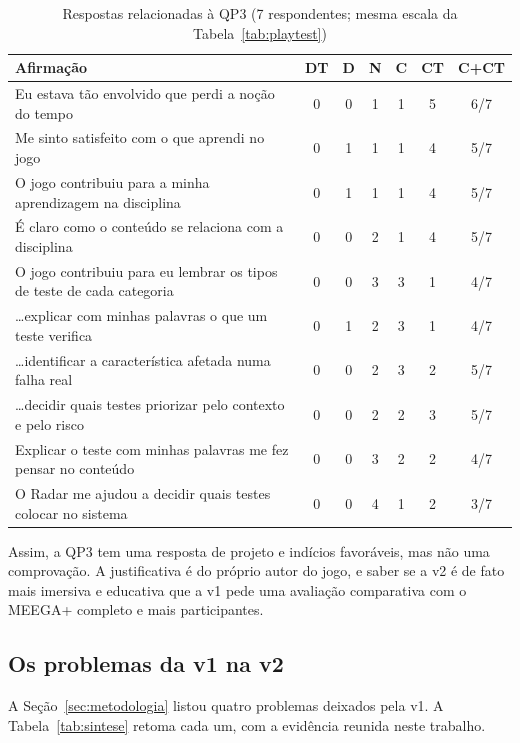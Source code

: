 \begin{table}[ht]
  \centering
  \caption{Respostas relacionadas à QP3 (7 respondentes; mesma escala da Tabela~\ref{tab:playtest})}
  \label{tab:qp3}
  \scriptsize
  \begin{tabularx}{\linewidth}{>{\raggedright\arraybackslash}X c c c c c c}
    \toprule
    Afirmação & DT & D & N & C & CT & C+CT \\
    \midrule
    Eu estava tão envolvido que perdi a noção do tempo & 0 & 0 & 1 & 1 & 5 & 6/7 \\
    Me sinto satisfeito com o que aprendi no jogo & 0 & 1 & 1 & 1 & 4 & 5/7 \\
    O jogo contribuiu para a minha aprendizagem na disciplina & 0 & 1 & 1 & 1 & 4 & 5/7 \\
    É claro como o conteúdo se relaciona com a disciplina & 0 & 0 & 2 & 1 & 4 & 5/7 \\
    O jogo contribuiu para eu lembrar os tipos de teste de cada categoria & 0 & 0 & 3 & 3 & 1 & 4/7 \\
    \ldots explicar com minhas palavras o que um teste verifica & 0 & 1 & 2 & 3 & 1 & 4/7 \\
    \ldots identificar a característica afetada numa falha real & 0 & 0 & 2 & 3 & 2 & 5/7 \\
    \ldots decidir quais testes priorizar pelo contexto e pelo risco & 0 & 0 & 2 & 2 & 3 & 5/7 \\
    Explicar o teste com minhas palavras me fez pensar no conteúdo & 0 & 0 & 3 & 2 & 2 & 4/7 \\
    O Radar me ajudou a decidir quais testes colocar no sistema & 0 & 0 & 4 & 1 & 2 & 3/7 \\
    \bottomrule
  \end{tabularx}
\end{table}

Assim, a QP3 tem uma resposta de projeto e indícios favoráveis, mas não uma comprovação. A justificativa é do
próprio autor do jogo, e saber se a v2 é de fato mais imersiva e educativa que a v1 pede uma avaliação comparativa
com o MEEGA+ completo e mais participantes.

\subsection{Os problemas da v1 na v2}
\label{sec:sintese}

A Seção~\ref{sec:metodologia} listou quatro problemas deixados pela v1. A Tabela~\ref{tab:sintese}
retoma cada um, com a evidência reunida neste trabalho.

